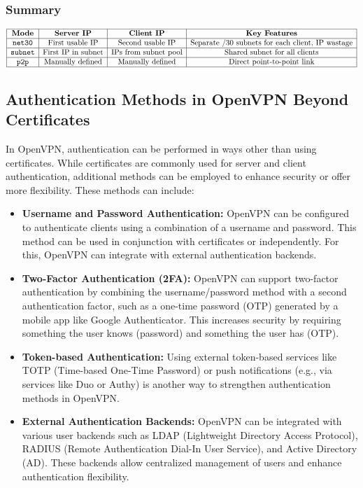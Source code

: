 \subsubsection{Summary}
\[
\begin{array}{|c|c|c|c|}
\hline
\textbf{Mode} & \textbf{Server IP} & \textbf{Client IP} & \textbf{Key Features} \\
\hline
\texttt{net30} & \text{First usable IP} & \text{Second usable IP} & \text{Separate /30 subnets for each client, IP wastage} \\
\hline
\texttt{subnet} & \text{First IP in subnet} & \text{IPs from subnet pool} & \text{Shared subnet for all clients} \\
\hline
\texttt{p2p} & \text{Manually defined} & \text{Manually defined} & \text{Direct point-to-point link} \\
\hline
\end{array}
\]

\subsection{Authentication Methods in OpenVPN Beyond Certificates}

In OpenVPN, authentication can be performed in ways other than using certificates. While certificates are commonly used for server and client authentication, additional methods can be employed to enhance security or offer more flexibility. These methods can include:

\begin{itemize}
    \item \textbf{Username and Password Authentication:} OpenVPN can be configured to authenticate clients using a combination of a username and password. This method can be used in conjunction with certificates or independently. For this, OpenVPN can integrate with external authentication backends.
    
    \item \textbf{Two-Factor Authentication (2FA):} OpenVPN can support two-factor authentication by combining the username/password method with a second authentication factor, such as a one-time password (OTP) generated by a mobile app like Google Authenticator. This increases security by requiring something the user knows (password) and something the user has (OTP).
    
    \item \textbf{Token-based Authentication:} Using external token-based services like TOTP (Time-based One-Time Password) or push notifications (e.g., via services like Duo or Authy) is another way to strengthen authentication methods in OpenVPN.
    
    \item \textbf{External Authentication Backends:} OpenVPN can be integrated with various user backends such as LDAP (Lightweight Directory Access Protocol), RADIUS (Remote Authentication Dial-In User Service), and Active Directory (AD). These backends allow centralized management of users and enhance authentication flexibility.
\end{itemize}

